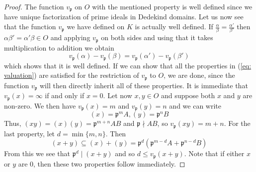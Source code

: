 \documentclass{article}
\newcommand{\mfrak}[1]{\mathfrak{#1}}
\newcommand{\mbb}[1]{\mathbb{#1}}
\newcommand{\vp}{{v_{\mfrak p}}}
\begin{document}
\begin{proof}
    The function $\vp$ on $O$ with the mentioned property is well defined since we have unique factorization of prime ideals in Dedekind domains. Let us now see that the function $\vp$ we have defined on $K$ is actually well defined. If $\frac{\alpha}{\beta} = \frac{\alpha'}{\beta'}$ then $\alpha\beta' = \alpha'\beta \in O$ and applying $\vp$ on both sides and using that it takes multiplication to addition we obtain
    $$\vp(\alpha) - \vp(\beta) = \vp(\alpha') - \vp(\beta')$$
    which shows that it is well defined. If we can show that all the properties in (\ref{eq: valuation}) are satisfied for the restriction of $\vp$ to $O$, we are done, since the function $\vp$ will then directly inherit all of these properties. It is immediate that $\vp(x) = \infty$ if and only if $x = 0$. Let now $x,y \in O$ and suppose both $x$ and $y$ are non-zero. We then have $\vp (x) = m$ and $\vp (y) = n$ and we can write
    $$(x) = \mfrak{p}^m A, (y) = \mfrak{p}^n B$$
    Thus, $(xy) = (x)(y) = \mfrak{p}^{m+n} AB$ and $\mfrak p \nmid AB$, so $\vp(xy) = m + n$. For the last property, let $d = \min\{m, n\}$. Then
    $$(x + y) \subseteq (x) + (y) = \mfrak p^d (\mfrak p^{m-d} A + \mfrak p^{n-d} B)$$
    From this we see that $\mfrak p^d \mid (x + y)$ and so $d \leq \vp (x+y)$. 
    Note that if either $x$ or $y$ are 0, then these two properties follow immediately.
    

\end{proof}
\end{document}

